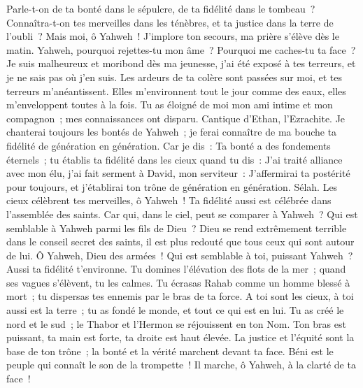 \begin{multicols}{2}
Parle-t-on de ta bonté dans le sépulcre, de ta fidélité dans le tombeau~?
Connaîtra-t-on tes merveilles dans les ténèbres, et ta justice dans la terre de l'oubli~?
Mais moi, ô Yahweh~! J'implore ton secours, ma prière s'élève dès le matin.
Yahweh, pourquoi rejettes-tu mon âme~? Pourquoi me caches-tu ta face~?
Je suis malheureux et moribond dès ma jeunesse, j'ai été exposé à tes terreurs, et je ne sais pas où j'en suis.
Les ardeurs de ta colère sont passées sur moi, et tes terreurs m'anéantissent.
Elles m'environnent tout le jour comme des eaux, elles m'enveloppent toutes à la fois.
Tu as éloigné de moi mon ami intime et mon compagnon~; mes connaissances ont disparu.
\VerseOne{}Cantique d'Ethan, l'Ezrachite.
Je chanterai toujours les bontés de Yahweh~; je ferai connaître de ma bouche ta fidélité de génération en génération.
Car je dis~: Ta bonté a des fondements éternels~; tu établis ta fidélité dans les cieux quand tu dis~:
J'ai traité alliance avec mon élu, j'ai fait serment à David, mon serviteur~:
J'affermirai ta postérité pour toujours, et j'établirai ton trône de génération en génération. Sélah.
Les cieux célèbrent tes merveilles, ô Yahweh~! Ta fidélité aussi est célébrée dans l'assemblée des saints.
Car qui, dans le ciel, peut se comparer à Yahweh~? Qui est semblable à Yahweh parmi les fils de Dieu~?
Dieu se rend extrêmement terrible dans le conseil secret des saints, il est plus redouté que tous ceux qui sont autour de lui.
Ô Yahweh, Dieu des armées~! Qui est semblable à toi, puissant Yahweh~? Aussi ta fidélité t'environne.
Tu domines l'élévation des flots de la mer~; quand ses vagues s'élèvent, tu les calmes.
Tu écrasas Rahab comme un homme blessé à mort~; tu dispersas tes ennemis par le bras de ta force.
A toi sont les cieux, à toi aussi est la terre~; tu as fondé le monde, et tout ce qui est en lui.
Tu as créé le nord et le sud~; le Thabor et l'Hermon se réjouissent en ton Nom.
Ton bras est puissant, ta main est forte, ta droite est haut élevée.
La justice et l'équité sont la base de ton trône~; la bonté et la vérité marchent devant ta face.
Béni est le peuple qui connaît le son de la trompette~! Il marche, ô Yahweh, à la clarté de ta face~!

\end{multicols}
